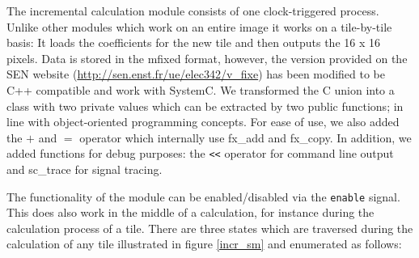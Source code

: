 The incremental calculation module consists of one clock-triggered process. Unlike other modules which work on an entire image it works on a tile-by-tile basis: It loads the coefficients for the new tile and then outputs the 16 x 16 pixels. Data is stored in the mfixed format, however, the version provided on the SEN website (\url{http://sen.enst.fr/ue/elec342/v_fixe}) has been modified to be C++ compatible and work with SystemC. We transformed the C union into a class with two private values which can be extracted by two public functions; in line with object-oriented programming concepts. For ease of use, we also added the $+$ and $=$ operator which internally use fx\_add and fx\_copy. In addition, we added functions for debug purposes: the \texttt{<}\texttt{<} operator for command line output and sc\_trace for signal tracing.

The functionality of the module can be enabled/disabled via the \texttt{enable} signal. This does also work in the middle of a calculation, for instance during the calculation process of a tile. There are three states which are traversed during the calculation of any tile illustrated in figure \ref{incr_sm} and enumerated as follows:

